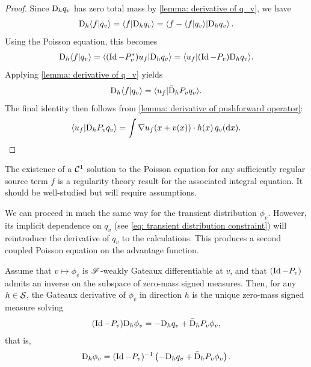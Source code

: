 \documentclass[twoside,10pt]{../jmlr}
\begin{document}
\begin{proof}
    Since $\mathrm{D}_h q_v$ has zero total mass by \cref{lemma: derivative of q_v}, we have
    \begin{align}
        \mathrm{D}_h\langle f\vert q_v\rangle
        =\langle f\vert \mathrm{D}_h q_v\rangle
        =\left\langle f-\langle f\vert q_v\rangle\middle\vert \mathrm{D}_h q_v\right\rangle.
    \end{align}
    Using the Poisson equation, this becomes
    \begin{align}
        \mathrm{D}_h\langle f\vert q_v\rangle
        =\langle (\operatorname{Id}-P_v^*)u_f\vert \mathrm{D}_h q_v\rangle
        =\langle u_f\vert (\operatorname{Id}-P_v)\mathrm{D}_h q_v\rangle.
    \end{align}
    Applying \cref{lemma: derivative of q_v} yields
    \begin{align}
        \mathrm{D}_h\langle f\vert q_v\rangle=\langle u_f\vert \bar{\mathrm{D}}_h P_v q_v\rangle.
    \end{align}
    The final identity then follows from \cref{lemma: derivative of pushforward operator}:
    \begin{align}
        \langle u_f\vert \bar{\mathrm{D}}_h P_v q_v\rangle
        =\int \nabla u_f(x+v(x))\cdot h(x)\,q_v(\mathrm{d} x).
    \end{align}
\end{proof}


\begin{remark}
    The existence of a $\mathcal{C}^1$ solution to the Poisson equation for any sufficiently regular source term $f$ is a regularity theory result for the associated integral equation. It should be well-studied but will require assumptions. 
\end{remark}

We can proceed in much the same way for the transient distribution $\phi_v$. However, its implicit dependence on $q_v$ (see \eqref{eq: transient distribution constraint}) will reintroduce the derivative of $q_v$ to the calculations. This produces a second coupled Poisson equation on the advantage function.

\begin{lemma}\label{lemma: derivative of phi_v}
    Assume that $v\mapsto \phi_v$ is $\mathscr{F}$-weakly Gateaux differentiable at $v$, and that $(\operatorname{Id}-P_v)$ admits an inverse on the subspace of zero-mass signed measures. Then, for any $h\in\mathcal{S}$, the Gateaux derivative of $\phi_v$ in direction $h$ is the unique zero-mass signed measure solving
    \begin{align}
        (\operatorname{Id}-P_v)\mathrm{D}_h\phi_v=-\mathrm{D}_h q_v+\bar{\mathrm{D}}_h P_v\phi_v,
    \end{align}
    that is,
    \begin{align}
        \mathrm{D}_h\phi_v=(\operatorname{Id}-P_v)^{-1}\left(-\mathrm{D}_h q_v+\bar{\mathrm{D}}_h P_v\phi_v\right).
    \end{align}
\end{lemma}
\end{document}
